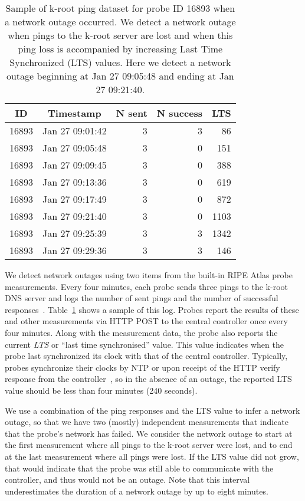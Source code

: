 \begin{table}[th]
  \small
  \centering
  \begin{tabular}{c|r|r|r|r}
    \textbf{ID} & \multicolumn{1}{c|}{\textbf{Timestamp}} & \textbf{N sent} &\textbf{N success} &\textbf{LTS}\\
    \hline
    16893 & Jan 27 09:01:42 & 3 & 3 & 86\\
    16893 & Jan 27 09:05:48 & 3 & 0 & 151\\
    16893 & Jan 27 09:09:45 & 3 & 0 & 388\\
    16893 & Jan 27 09:13:36 & 3 & 0 & 619\\
    16893 & Jan 27 09:17:49 & 3 & 0 & 872\\
    16893 & Jan 27 09:21:40 & 3 & 0 & 1103\\
    16893 & Jan 27 09:25:39 & 3 & 3 & 1342\\
    16893 & Jan 27 09:29:36 & 3 & 3 & 146\\
    \end{tabular}
    \caption{Sample of k-root ping dataset for probe ID 16893 when a network outage occurred. We detect a network outage when pings to the k-root server are lost and when this ping loss is accompanied by increasing Last Time Synchronized (LTS) values. Here we detect a network outage beginning at Jan 27 09:05:48 and ending at Jan 27 09:21:40.}
    \label{tbl:sample_pings}
\end{table}

We detect network outages using two items from the built-in
RIPE Atlas probe measurements.  Every four minutes, each
probe sends three pings to the k-root DNS server and logs
the number of sent pings and the number of successful
responses~\cite{atlas-built-in}.
Table~\ref{tbl:sample_pings} shows a sample of this
log. Probes report the results of these and other
measurements via HTTP POST to the central controller once
every four minutes.  Along with the measurement data, the
probe also reports the current \emph{LTS} or ``last time
synchronised'' value. This value indicates when the probe
last synchronized its clock with that of the central
controller. Typically, probes synchronize their clocks by NTP or upon receipt of the HTTP
verify response from the controller~\cite{homburg-ntp}, so in the absence of an outage, the
reported LTS value should be less than four minutes (240
seconds).

We use a combination of the ping responses and the LTS value
to infer a network outage, so that we have two (mostly)
independent measurements that indicate that the probe's network
has failed.  We consider the network outage to start at the
first measurement where all pings to the k-root server were
lost, and to end at the last measurement where all pings
were lost.  If the LTS value did not grow, that would
indicate that the probe was still able to communicate with
the controller, and thus would not be an outage. Note that
this interval underestimates the duration of a network
outage by up to eight minutes.

